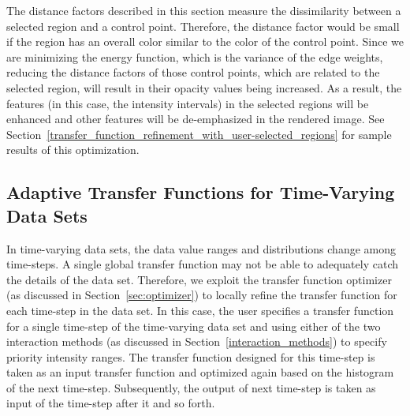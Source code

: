 The distance factors described in this section measure the dissimilarity between a selected region and a control point. Therefore, the distance factor would be small if the region has an overall color similar to the color of the control point.
Since we are minimizing the energy function, which is the variance of the edge weights, reducing the distance factors of those control points, which are related to the selected region, will result in their opacity values being increased. As a result, the features (in this case, the intensity intervals) in the selected regions will be enhanced and other features will be de-emphasized in the rendered image.
See Section~\ref{transfer_function_refinement_with_user-selected_regions} for sample results of this optimization.


\subsection{Adaptive Transfer Functions for Time-Varying Data Sets \label{adative_transfer_functions_for_time-varying_data_sets}}
In time-varying data sets, the data value ranges and distributions change among time-steps. A single global transfer function may not be able to adequately catch the details of the data set.
Therefore, we exploit the transfer function optimizer (as discussed in Section~\ref{sec:optimizer}) to locally refine the transfer function for each time-step in the data set.
In this case, the user specifies a transfer function for a single time-step of the time-varying data set and using either of the two interaction methods (as discussed in Section~\ref{interaction_methods}) to specify priority intensity ranges.
The transfer function designed for this time-step is taken as an input transfer function and optimized again based on the histogram of the next time-step. Subsequently, the output of next time-step is taken as input of the time-step after it and so forth.

